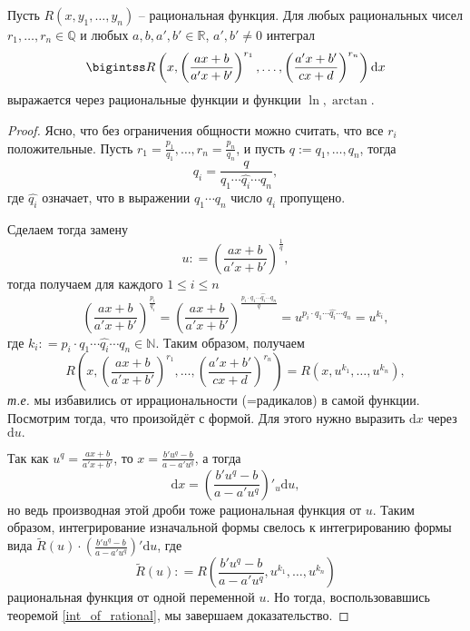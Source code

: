 \begin{theorem}
Пусть $R(x,y_1,\ldots, y_n)$ -- рациональная функция. Для любых рациональных чисел $r_1, \ldots, r_n \in \mathbb{Q}$ и любых $a,b,a',b' \in \mathbb{R}$, $a',b'\ne 0$ интеграл
 \[
  \bigintss R\left(x, \left(\frac{ax+b}{a'x+b'} \right)^{r_1}, \ldots, \left(\frac{a'x+b'}{cx+d} \right)^{r_n} \right)\mathrm{d}x
 \]
 выражается через рациональные функции и функции $\ln, \arctan.$
\end{theorem}
\begin{proof}
Ясно, что без ограничения общности можно считать, что все $r_i$ положительные. Пусть $r_1 = \frac{p_1}{q_1}, \ldots, r_n = \frac{p_n}{q_n}$, и пусть $q:=q_1,\ldots, q_n$, тогда
\[
 q_i = \frac{q }{q_1 \cdots \widehat{q_i}\cdots q_n},
\]
где $\widehat{q_i}$ означает, что в выражении $q_1\cdots q_n$ число $q_i$ пропущено.

Сделаем тогда замену 
    \[
     u: = \left(\frac{ax + b}{a'x + b'} \right)^{\frac{1}{q}},
    \]
    тогда получаем для каждого $1\le i \le n$
    \[
    \left( \frac{ax+b}{a'x + b'} \right)^{\frac{p_i}{q_i}} =  \left( \frac{ax+b}{a'x + b'} \right)^{\frac{p_i\cdot q_1 \cdots \widehat{q_i}\cdots q_n}{q}} = u^{p_i\cdot q_1 \cdots \widehat{q_i}\cdots q_n} = u^{k_i},
    \]
где $k_i : = p_i\cdot q_1 \cdots \widehat{q_i}\cdots q_n \in \mathbb{N}$. Таким образом, получаем
\[
 R\left(x, \left(\frac{ax+b}{a'x+b'} \right)^{r_1}, \ldots, \left(\frac{a'x+b'}{cx+d} \right)^{r_n} \right) = R(x,u^{k_1},\ldots, u^{k_n}),
\]
\textit{т.е.} мы избавились от иррациональности (=радикалов) в самой функции. Посмотрим тогда, что произойдёт с формой. Для этого нужно выразить $\mathrm{d}x$ через $\mathrm{d}u.$

Так как $u^q = \frac{ax + b}{a'x+b'}$, то $x = \frac{b'u^q - b}{a - a'u^q}$, а тогда 
\[
 \mathrm{d}x = \left(\frac{b'u^q - b}{a - a'u^q} \right)'_u\mathrm{d}u,
\]
но ведь производная этой дроби тоже рациональная функция от $u$. Таким образом, интегрирование изначальной формы свелось к интегрированию формы вида $\widetilde{R}(u)\cdot\left(\frac{b'u^q - b}{a - a'u^q} \right)'\mathrm{d}u$, где 
\[
 \widetilde{R}(u): = R\left( \frac{b'u^q- b}{a- a'u^q}, u^{k_1}, \ldots, u^{k_n} \right)
\]
рациональная функция от одной переменной $u.$ Но тогда, воспользовавшись теоремой \ref{int_of_rational}, мы завершаем доказательство.
\end{proof}


